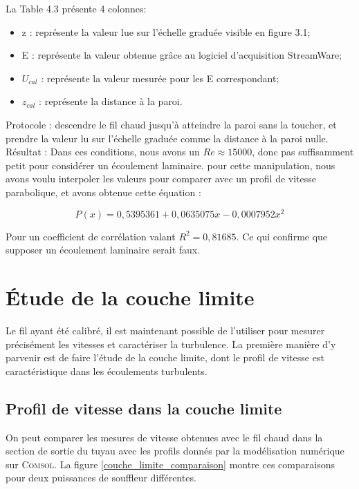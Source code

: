 \documentclass[12pt, a4paper]{report}
\begin{document}
	La Table 4.3 présente 4 colonnes:
	\begin{itemize}
		\item z : représente la valeur lue sur l'échelle graduée visible  en figure 3.1;
		\item E : représente la valeur obtenue grâce au logiciel d'acquisition StreamWare;
		\item $U_{cal}$ : représente la valeur mesurée pour les E correspondant;
		\item $z_{cal}$ : représente la distance à la paroi.\\ 
	\end{itemize}
	
	Protocole : descendre le fil chaud jusqu'à atteindre la paroi sans la toucher, et prendre la valeur lu sur l'échelle graduée comme la distance à la paroi nulle.\\
	
	Résultat : Dans ces conditions, nous avons un $Re \approx 15 000$, donc pas suffisamment petit pour considérer un écoulement laminaire. pour cette manipulation, nous avons voulu interpoler les valeurs pour comparer avec un profil de vitesse parabolique, et avons obtenue cette équation : 
	
	\begin{equation*}
		\boxed{P(x) = 0,5395361 + 0,0635075x-0,0007952x^2}
	\end{equation*}
	
	Pour un coefficient de corrélation valant $R^2=0,81685$. Ce qui confirme que supposer un écoulement laminaire serait faux.

	
	\section{Étude de la couche limite}
	Le fil ayant été calibré, il est maintenant possible de l'utiliser pour mesurer précisément les vitesses et caractériser la turbulence. La première manière d'y parvenir est de faire l'étude de la couche limite, dont le profil de vitesse est caractéristique dans les écoulements turbulents.
	
	\subsection{Profil de vitesse dans la couche limite}
	On peut comparer les mesures de vitesse obtenues avec le fil chaud dans la section de sortie du tuyau avec les profils donnés par la modélisation numérique sur \textsc{Comsol}. La figure \ref{couche_limite_comparaison} montre ces comparaisons pour deux puissances de souffleur différentes.\\
	
\end{document}
